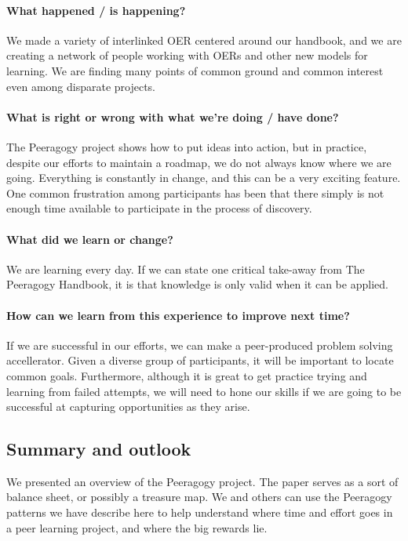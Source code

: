 \documentclass{acm_proc_article-sp}
\begin{document}
\paragraph{What happened / is happening?}
We made a variety of interlinked OER centered
around our handbook, and we are creating a network of people working
with OERs and other new models for learning. We are finding many
points of common ground and common interest even among disparate
projects.
\paragraph{What is right or wrong with what we're doing / have done?}
The Peeragogy project shows how to put ideas into action, but in
practice, despite our efforts to maintain a roadmap, we do not always
know where we are going. Everything is constantly in change, and this
can be a very exciting feature. One common frustration among
participants has been that there simply is not enough time available to
participate in the process of discovery.
\paragraph{What did we learn or change?}
We are learning every day. If we can state one critical take-away from
The Peeragogy Handbook, it is that knowledge is only valid when it
can be applied.
\paragraph{How can we learn from this experience to improve next time?}
If we are successful in our efforts, we can make a peer-produced
problem solving accellerator. Given a diverse group of participants, it will be
important to locate common goals. Furthermore, although it is great
to get practice trying and learning from failed attempts, we will need
to hone our skills if we are going to be successful at capturing
opportunities as they arise.

\subsection{Summary and outlook}

We presented an overview of the Peeragogy project. The paper serves
as a sort of balance sheet, or possibly a treasure map. We and others
can use the Peeragogy patterns we have describe here to help understand
where time and effort goes in a peer learning project, and where the
big rewards lie.
\end{document}
